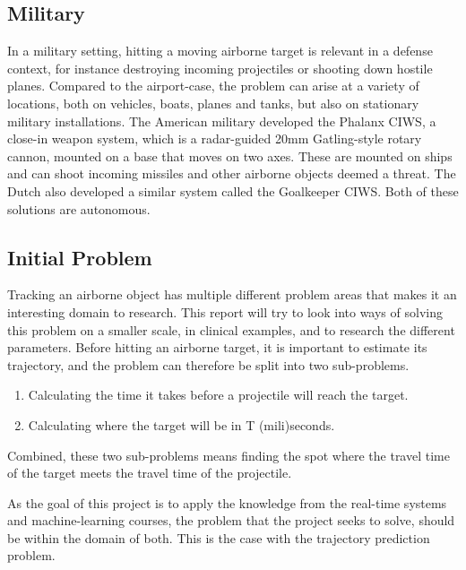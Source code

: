 \subsection{Military}
In a military setting, hitting a moving airborne target is relevant in a defense context, for instance destroying incoming projectiles or shooting down hostile planes.
Compared to the airport-case, the problem can arise at a variety of locations, both on vehicles, boats, planes and tanks, but also on stationary military installations.
The American military developed the Phalanx CIWS, a close-in weapon system, which is a radar-guided 20mm Gatling-style rotary cannon, mounted on a base that moves on two axes\cite{PhalanxCIWS}.
These are mounted on ships and can shoot incoming missiles and other airborne objects deemed a threat.
The Dutch also developed a similar system called the Goalkeeper CIWS.
Both of these solutions are autonomous.

\subsection{Initial Problem}

Tracking an airborne object has multiple different problem areas that makes it an interesting domain to research.
This report will try to look into ways of solving this problem on a smaller scale, in clinical examples, and to research the different parameters.
Before hitting an airborne target, it is important to estimate its trajectory, and the problem can therefore be split into two sub-problems.
\begin{enumerate}
  \item Calculating the time it takes before a projectile will reach the target.
  \item Calculating where the target will be in T (mili)seconds.
\end{enumerate}
Combined, these two sub-problems means finding the spot where the travel time of the target meets the travel time of the projectile.

As the goal of this project is to apply the knowledge from the real-time systems and machine-learning courses, the problem that the project seeks to solve, should be within the domain of both.
This is the case with the trajectory prediction problem.

